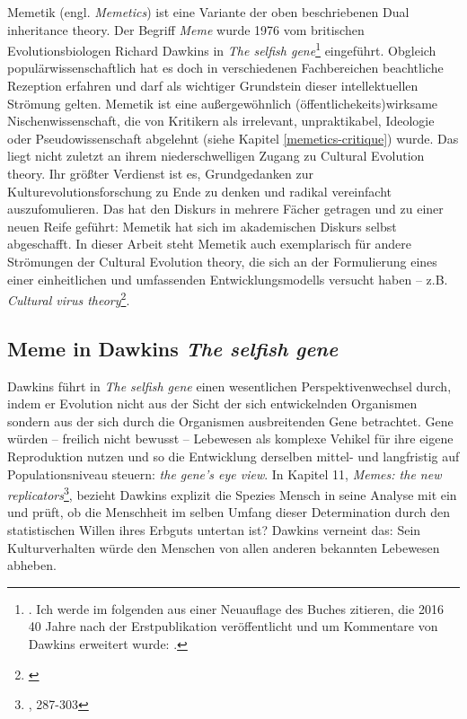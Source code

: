 \documentclass[openany,twoside,twocolumn]{book}
\let\rmarkdownfootnote\footnote%
\def\footnote{\protect\rmarkdownfootnote}
\begin{document}
Memetik (engl. \emph{Memetics}) ist eine Variante der oben beschriebenen
Dual inheritance theory. Der Begriff \emph{Meme} wurde 1976 vom
britischen Evolutionsbiologen Richard Dawkins in \emph{The selfish
gene}\footnote{\textcite{Dawkinsselfishgene1976}. Ich werde im folgenden
  aus einer Neuauflage des Buches zitieren, die 2016 40 Jahre nach der
  Erstpublikation veröffentlicht und um Kommentare von Dawkins erweitert
  wurde: \textcite{Dawkinsselfishgene40th2016}.} eingeführt. Obgleich
populärwissenschaftlich hat es doch in verschiedenen Fachbereichen
beachtliche Rezeption erfahren und darf als wichtiger Grundstein dieser
intellektuellen Strömung gelten. Memetik ist eine außergewöhnlich
(öffentlichekeits)wirksame Nischenwissenschaft, die von Kritikern als
irrelevant, unpraktikabel, Ideologie oder Pseudowissenschaft abgelehnt
(siehe Kapitel \ref{memetics-critique}) wurde. Das liegt nicht zuletzt
an ihrem niederschwelligen Zugang zu Cultural Evolution theory. Ihr
größter Verdienst ist es, Grundgedanken zur Kulturevolutionsforschung zu
Ende zu denken und radikal vereinfacht auszufomulieren. Das hat den
Diskurs in mehrere Fächer getragen und zu einer neuen Reife geführt:
Memetik hat sich im akademischen Diskurs selbst abgeschafft. In dieser
Arbeit steht Memetik auch exemplarisch für andere Strömungen der
Cultural Evolution theory, die sich an der Formulierung eines einer
einheitlichen und umfassenden Entwicklungsmodells versucht haben -- z.B.
\emph{Cultural virus theory}\footnote{\textcite{cullen_contagious_2000}}.

\hypertarget{memetics-dawkins}{%
\subsection{\texorpdfstring{Meme in Dawkins \emph{The selfish
gene}}{Meme in Dawkins The selfish gene}}\label{memetics-dawkins}}

Dawkins führt in \emph{The selfish gene} einen wesentlichen
Perspektivenwechsel durch, indem er Evolution nicht aus der Sicht der
sich entwickelnden Organismen sondern aus der sich durch die Organismen
ausbreitenden Gene betrachtet. Gene würden -- freilich nicht bewusst --
Lebewesen als komplexe Vehikel für ihre eigene Reproduktion nutzen und
so die Entwicklung derselben mittel- und langfristig auf
Populationsniveau steuern: \emph{the gene's eye view}. In Kapitel 11,
\emph{Memes: the new replicators}\footnote{\textcite{Dawkinsselfishgene40th2016},
  287-303}, bezieht Dawkins explizit die Spezies Mensch in seine Analyse
mit ein und prüft, ob die Menschheit im selben Umfang dieser
Determination durch den statistischen Willen ihres Erbguts untertan ist?
Dawkins verneint das: Sein Kulturverhalten würde den Menschen von allen
anderen bekannten Lebewesen abheben.
\end{document}
